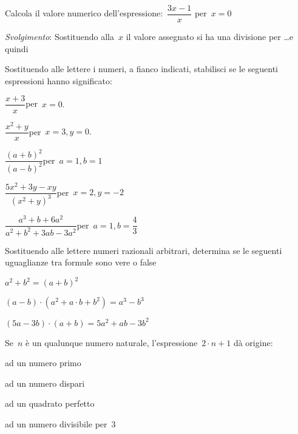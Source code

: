 \begin{esercizio}
 \label{ese:8.26}
Calcola il valore numerico dell'espressione:~$\dfrac{3x-1}{x}$ per~$x = 0$

\emph{Svolgimento}: Sostituendo alla~$x$ il valore assegnato si ha una
divisione per \ldots e quindi \dotfill
\end{esercizio}

\begin{esercizio}[\Ast]
 \label{ese:8.27}
Sostituendo alle lettere i numeri, a fianco indicati, stabilisci se le
seguenti espressioni hanno significato:
\TabPositions{8cm}
\begin{enumeratea}
\item $\dfrac{x+3}{x}$\quad per~$x=0.$ \tab\boxSi\quad\boxNo
\item $\dfrac{x^{2}+y}{x}$\quad per~$x=3, y=0.$ \tab\boxSi\quad\boxNo
\item $\dfrac{(a+b)^{2}}{(a-b)^{2}}$\quad per~$a=1, b=1$ \tab\boxSi\quad\boxNo
\item $\dfrac{5x^{2}+3y-xy}{(x^{2}+y)^{3}}$\quad per~$x=2, y=-2$ 
\tab\boxSi\quad\boxNo
\item $\dfrac{a^{3}+b+6a^{2}}{a^{2}+b^{2}+3ab-3a^{2}}$\quad per~$a=1, 
b=\dfrac{4}{3}$ \tab\boxSi\quad\boxNo
\end{enumeratea}
\end{esercizio}

\begin{esercizio}
 \label{ese:8.28}
 Sostituendo alle lettere numeri razionali
arbitrari, determina se le seguenti uguaglianze tra formule sono
vere o false
\TabPositions{8cm}
\begin{enumeratea}
 \item $a^{2}+b^{2}=(a+b)^{2}$ \tab\boxV\quad\boxF
 \item $(a-b)\cdot (a^{2}+a\cdot b+b^{2})=a^{3}-b^{3}$ \tab\boxV\quad\boxF
 \item $(5a-3b)\cdot (a+b)=5a^{2}+ab-3b^{2}$ \tab\boxV\quad\boxF
\end{enumeratea}
\end{esercizio}

\begin{esercizio}
 \label{ese:8.29}
 Se~$n$ è un qualunque numero naturale,
l'espressione~$2\cdot n+1$ dà origine:
\begin{multicols}{2}
\boxA\quad ad un numero primo

\boxB\quad ad un numero dispari

\boxC\quad ad un quadrato perfetto

\boxD\quad ad un numero divisibile per~3
\end{multicols}
\end{esercizio}

